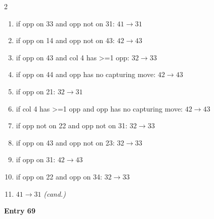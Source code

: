\begin{multicols}{2}
\begin{tikzpicture}[scale=0.24]
\end{tikzpicture}
\nopagebreak\begin{enumerate}[topsep=1pt,itemsep=0pt,parsep=0pt,leftmargin=2.2em,label=\arabic*.]
\item if opp on 33 and opp not on 31: $41\!\to\!31$
\item if opp on 14 and opp not on 43: $42\!\to\!43$
\item if opp on 43 and col 4 has >=1 opp: $32\!\to\!33$
\item if opp on 44 and opp has no capturing move: $42\!\to\!43$
\item if opp on 21: $32\!\to\!31$
\item if col 4 has >=1 opp and opp has no capturing move: $42\!\to\!43$
\item if opp not on 22 and opp not on 31: $32\!\to\!33$
\item if opp on 43 and opp not on 23: $32\!\to\!33$
\item if opp on 31: $42\!\to\!43$
\item if opp on 22 and opp on 34: $32\!\to\!33$
\item $41\!\to\!31$ \hfill\textit{(cand.)}
\end{enumerate}\smallskip
\noindent\textbf{Entry 69} \; 
\end{multicols}
